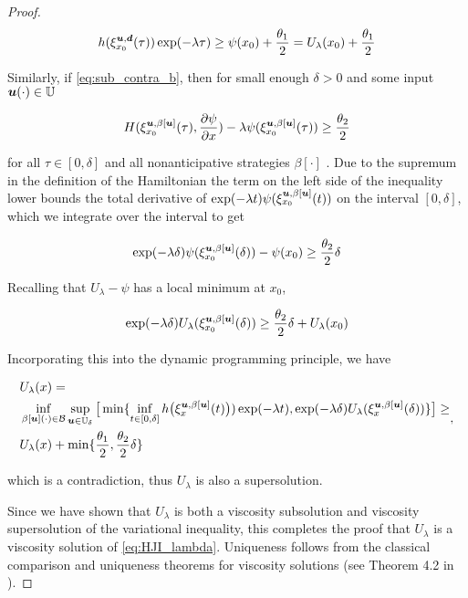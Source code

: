 \begin{for_journal}
\begin{proof}
\begin{equation}
h(\xi_{x_0}^{\bm{u}, \bm{d}}(\tau))\exp(-\lambda \tau) \geq \psi(x_0) + \frac{\theta_1}{2} = U_{\lambda}(x_0) + \frac{\theta_1}{2}
\end{equation}

Similarly, if \eqref{eq:sub_contra_b}, then for small enough $\delta>0$ and  some input $\bm{u}(\cdot) \in \mathbb{U}$ 

\begin{equation}
H(\xi_{x_0}^{\bm{u},\beta[\bm{u}]}(\tau), \frac{\partial \psi}{\partial x}) - \lambda \psi(\xi_{x_0}^{\bm{u},\beta[\bm{u}]}(\tau)) \geq \frac{\theta_2}{2}
\end{equation}

\noindent for all $\tau \in [0,\delta]$ and all nonanticipative strategies $\beta[\cdot]$ . Due to the supremum in the definition of the Hamiltonian the term on the left side of the inequality lower bounds the total derivative of $\exp(-\lambda t)\psi(\xi_{x_0}^{\bm{u},\beta[\bm{u}]}(t))$ on the interval $[0,\delta]$,  which we integrate over the interval to get

\begin{equation}
\exp(-\lambda \delta)\psi(\xi_{x_0}^{\bm{u},\beta[\bm{u}]}(\delta))-\psi(x_0) \geq \frac{\theta_2}{2} \delta
\end{equation}

Recalling that $U_{\lambda}-\psi$ has a local minimum at $x_0$,

\begin{equation}
\exp(-\lambda \delta)U_{\lambda}(\xi_{x_0}^{\bm{u},\beta[\bm{u}]}(\delta)) \geq \frac{\theta_2}{2} \delta + U_{\lambda}(x_0)
\end{equation}

Incorporating this into the dynamic programming principle, we have

\begin{equation} 
\begin{split}
&U_{\lambda}(x) =\\ 
&\inf_{\beta[\bm{u}](\cdot) \in \mathcal{B}} \sup_{\bm{u} \in \mathbb{U}_\delta} 
\big [\min\{\inf_{t \in [0, \delta]} h\big(\xi_{x}^{\bm{u},\beta[\bm{u}]}(t)\big))\exp(-\lambda  t), \exp(-\lambda \delta)U_{\lambda}(\xi_{x}^{\bm{u},\beta[\bm{u}]}(\delta))\} 
\big ]\geq\\
&U_{\lambda}(x) + \min\{\frac{\theta_1}{2}, \frac{\theta_2}{2} \delta \}
\end{split},
\end{equation}

 
\noindent which is a contradiction, thus $U_{\lambda}$ is also a supersolution.

Since we have shown that $U_{\lambda}$ is both a viscosity subsolution and viscosity supersolution of the variational inequality, this completes the proof that $U_{\lambda}$ is a viscosity solution of \eqref{eq:HJI_lambda}. Uniqueness follows from the classical comparison and uniqueness theorems for viscosity solutions (see Theorem 4.2 in \cite{Barron1989}).
\end{proof}
\end{for_journal}





